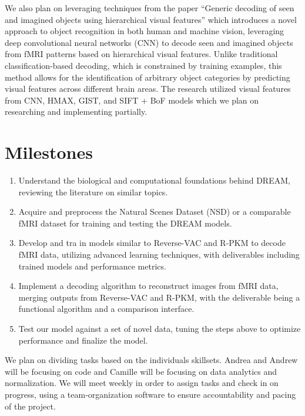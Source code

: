 \documentclass[10pt,twocolumn,letterpaper]{article}
\begin{document}
We also plan on leveraging techniques from the paper “Generic decoding of seen and imagined objects using hierarchical visual features” \cite{horikawa2017generic} which introduces a novel approach to object recognition in both human and machine vision, leveraging deep convolutional neural networks (CNN) to decode seen and imagined objects from fMRI patterns based on hierarchical visual features. Unlike traditional classification-based decoding, which is constrained by training examples, this method allows for the identification of arbitrary object categories by predicting visual features across different brain areas. The research utilized visual features from CNN, HMAX, GIST, and SIFT + BoF models which we plan on researching and implementing partially.

\section{Milestones}

\begin{enumerate}
    \item Understand the biological and computational foundations behind DREAM, reviewing the literature on similar topics. 
    \item Acquire and preprocess the Natural Scenes Dataset (NSD) or a comparable fMRI dataset for training and testing the DREAM models.
    \item Develop and tra in models similar to Reverse-VAC and R-PKM to decode fMRI data, utilizing advanced learning techniques, with deliverables including trained models and performance metrics.
    \item Implement a decoding algorithm to reconstruct images from fMRI data, merging outputs from Reverse-VAC and R-PKM, with the deliverable being a functional algorithm and a comparison interface.
    \item Test our model against a set of novel data, tuning the steps above to optimize performance and finalize the model.
\end{enumerate}

We plan on dividing tasks based on the individuals skillsets. Andrea and Andrew will be focusing on code and Camille will be focusing on data analytics and normalization. We will meet weekly in order to assign tasks and check in on progress, using a team-organization software to ensure accountability and pacing of the project.

{\small


}
\end{document}
